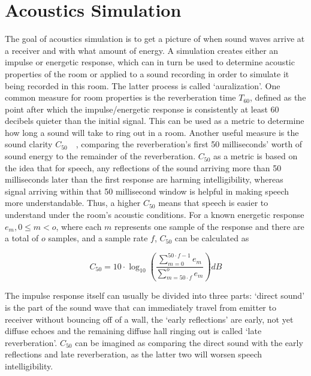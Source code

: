 \section{Acoustics Simulation}\label{sec:FundamentalAcoustics}

The goal of acoustics simulation is to get a picture of when sound waves arrive at a receiver and with what amount of energy.
A simulation creates either an impulse or energetic response,
which can in turn be used to determine acoustic properties of the room
or applied to a sound recording in order to simulate it being recorded in this room.
The latter process is called `auralization'.
\newline
One common measure for room properties is the reverberation time \(T_{60}\),
defined as the point after which the impulse/energetic response is consistently at least 60 decibels quieter than the initial signal.
This can be used as a metric to determine how long a sound will take to ring out in a room.
\newline
Another useful measure is the sound clarity \(C_{50}\)~\cite{AB18}~\cite{PMG22},
comparing the reverberation's first 50 milliseconds' worth of sound energy to the remainder of the reverberation.
\(C_{50}\) as a metric is based on the idea that for speech,
any reflections of the sound arriving more than 50 milliseconds later than the first response are harming intelligibility,
whereas signal arriving within that 50 millisecond window is helpful in making speech more understandable.
Thus, a higher \(C_{50}\) means that speech is easier to understand under the room's acoustic conditions.
\newline
For a known energetic response \(e_m, 0 \le m < o\), where each \(m\) represents one sample of the response and there are a total of \(o\) samples,
and a sample rate \(f\), \(C_{50}\) can be calculated as

\begin{equation}\label{eq:C50}
    C_{50} = 10 \cdot \log_{10} \left( \frac{\displaystyle\sum_{m=0}^{50 \cdot f - 1}e_m}{\displaystyle\sum_{m=50 \cdot f}^{o}e_m} \right) dB
\end{equation}

The impulse response itself can usually be divided into three parts:
`direct sound' is the part of the sound wave that can immediately travel from emitter to receiver without bouncing off of a wall,
the `early reflections' are early, not yet diffuse echoes
and the remaining diffuse hall ringing out is called `late reverberation'.
\(C_{50}\) can be imagined as comparing the direct sound with the early reflections and late reverberation,
as the latter two will worsen speech intelligibility.
